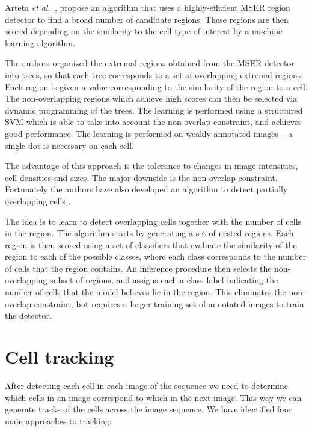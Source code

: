 Arteta \emph{et al.}~\cite{arteta12, arteta13}, propose an algorithm that uses a highly-efficient MSER region detector \cite{matas02} to find a broad number of candidate regions. These regions are then scored depending on the similarity to the cell type of interest by a machine learning algorithm. 

The authors organized the extremal regions obtained from the MSER detector into trees, so that each tree corresponds to a set of overlapping extremal regions. Each region is given a value corresponding to the similarity of the region to a cell. The non-overlapping regions which achieve high scores can then be selected via dynamic programming of the trees. The learning is performed using a structured SVM \cite{joachims09} which is able to take into account the non-overlap constraint, and achieves good performance. The learning is performed on weakly annotated images -- a single dot is necessary on each cell.

The advantage of this approach is the tolerance to changes in image intensities, cell densities and sizes. The major downside is the non-overlap constraint. Fortunately the authors have also developed an algorithm to detect partially overlapping cells \cite{arteta13}. 

The idea is to learn to detect overlapping cells together with the number of cells in the region. The algorithm starts by generating a set of nested regions. Each region is then scored using a set of classifiers that evaluate the similarity of the region to each of the possible classes, where each class corresponds to the number of cells that the region contains. An inference procedure then selects the non-overlapping subset of regions, and assigns each a class label indicating the number of cells that the model believes lie in the region. This eliminates the non-overlap constraint, but requires a larger training set of annotated images to train the detector.

\section{Cell tracking}
\label{sec:tracking}

After detecting each cell in each image of the sequence we need to determine which cells in an image correspond to which in the next image. This way we can generate tracks of the cells across the image sequence. We have identified four main approaches to tracking:

